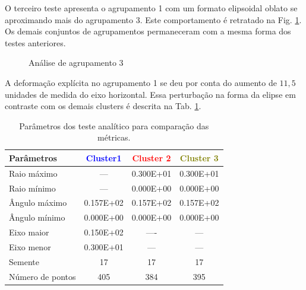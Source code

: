 O terceiro teste apresenta o agrupamento 1 com um formato elipsoidal oblato se aproximando mais do agrupamento 3. Este comportamento é retratado na Fig. \ref{AC3}. Os demais conjuntos de agrupamentos permaneceram com a mesma forma dos testes anteriores. 

\begin{figure}[H]
	\centering
	\setlength{\fboxsep}{8pt}
	\setlength{\fboxrule}{0.1pt}
	\caption{Análise de agrupamento 3}
	\label{AC3}
\end{figure}


A deformação explícita no agrupamento 1 se deu por conta do aumento de $11,5$ unidades de medida do eixo horizontal. Essa perturbação na forma da elipse em contraste com os demais clusters é descrita na Tab. \ref{analise3}.


\begin{table}[H]
	\centering
	\caption{Parâmetros dos teste analítico para comparação das métricas.}
	\label{analise3}
	\begin{tabular}{lccc}
		\hline
		Parâmetros       & \textcolor{blue}{Cluster1} & \textcolor{red}{Cluster 2} & \textcolor{olive}{Cluster 3} \\ \hline
		Raio máximo      & --- & 0.300E+01 & 0.300E+01 \\
		Raio mínimo      & --- & 0.000E+00 & 0.000E+00 \\
		Ângulo máximo    & 0.157E+02 & 0.157E+02 & 0.157E+02 \\
		Ângulo mínimo    & 0.000E+00 & 0.000E+00 & 0.000E+00 \\
		Eixo maior        & 0.150E+02        & ----         & ---         \\
		Eixo menor          &  0.300E+01        & ---       & ---        \\
		Semente          & 17         & 17         & 17         \\
		Número de pontos & 405       & 384       & 395  \\   \hline
	\end{tabular}
\end{table}


